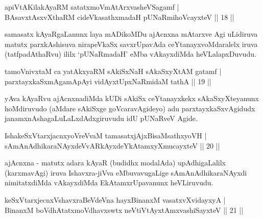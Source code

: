 
\begin{shl}
apiVtAKilakAyaRM satatxmoVmAtArxvasheVSagamf  | \\
BAsavxtAsxvXthaRM cideVkasathxmadaH pUNaRmihoVcayxteV \hfill||  18 ||  
\end{shl}

\begin{artha}
samasatx kAyaRgaLanunx laya mADikoMDu ajAcnxna mAtarxve Agi uLidiruva matutx parxkAshisuva nirapeVkaSx savxrUpavAda ceYtanayxvoMdaralelx iruva (tatfpadAthaRvu) ililx `pUNaRmadaH' eMba vAkayxdiMda heVLalapxDuvudu.
\end{artha}


\begin{shl}
tamoVnivxtaM ca yatAkxyaRM sAkiSxNaH sAkaSxyXtAM gatamf  | \\
parxtayxkaSxmAgamApAyi vidAyxtUpxNaRmidaM tathA \hfill||  19 ||  
\end{shl}

\begin{artha}
yAva kAyaRvu ajAcnxnadiMda kUDi sAkiSx ceYtanayxkekx sAkaSxyXteyanunx hoMdiruvudo (aMdare sAkiSxge goVcaravAgideyo) adu parxtayxkaSxvAgidudx janamxnAshagaLuLaLxdAdxgiruvudu idU pUNaRveV Agide.
\end{artha}

\begin{shl}
IshakeSxVtarxjacnxyoVreVvaM tamasatxjAjxBisaMsathxyoVH  | \\
sAmAnAdhikaraNAyxdeVvARkAyxdeYkAtamxyXmucayxteV \hfill||  20 ||  
\end{shl}

\begin{artha}
ajAcnxna - matutx adara kAyaR (budidhx modalAda) upAdhigaLalilx (karxmavAgi) iruva Ishavxra-jiVva eMbuvavugaLige sAmAnAdhikaraNAyxdi nimitatxdiMda vAkayxdiMda EkAtamxrUpavanunx heVLiruvudu.
\end{artha}


\begin{shl}
keSxVtarxjecnxVshavxraBeVdeVna hayxBinanxM vasatxvXvidayxyA  | \\
BinanxM boVdhAtatxmoVdhavxswtx neVtiVtAyxtAmx\s vashiSayxteV \hfill||  21 || 
\end{shl}

